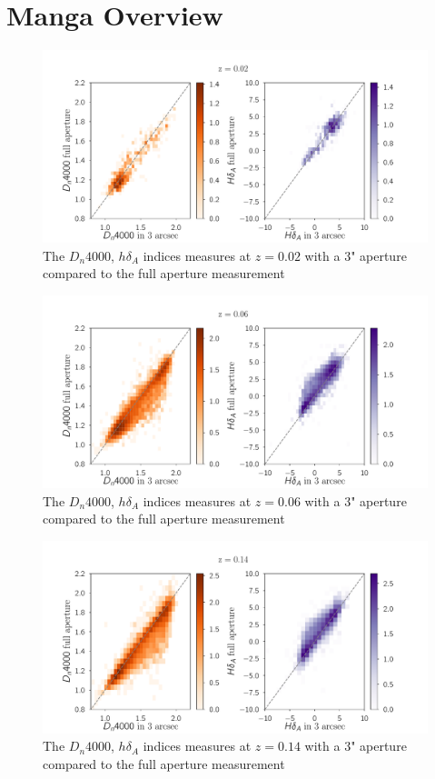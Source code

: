 \section{Manga Overview}
\begin{figure}
\includegraphics[width=\textwidth]{figures/a.pdf}
\caption[Short figure name.]{ The $D_{n}4000$, $h\delta_{A}$ indices measures at $z = 0.02$ with a $3$" aperture compared to the full aperture measurement
\label{fig:myInlineFigure}}
\end{figure}

\begin{figure}
\includegraphics[width=\textwidth]{figures/b.pdf}
\caption[Short figure name.]{ The $D_{n}4000$, $h\delta_{A}$ indices measures at $z = 0.06$ with a $3$" aperture compared to the full aperture measurement
\label{fig:myInlineFigure}}
\end{figure}

\begin{figure}
\includegraphics[width=\textwidth]{figures/c.pdf}
\caption[Short figure name.]{ The $D_{n}4000$, $h\delta_{A}$ indices measures at $z = 0.14$ with a $3$" aperture compared to the full aperture measurement
\label{fig:myInlineFigure}}
\end{figure}


